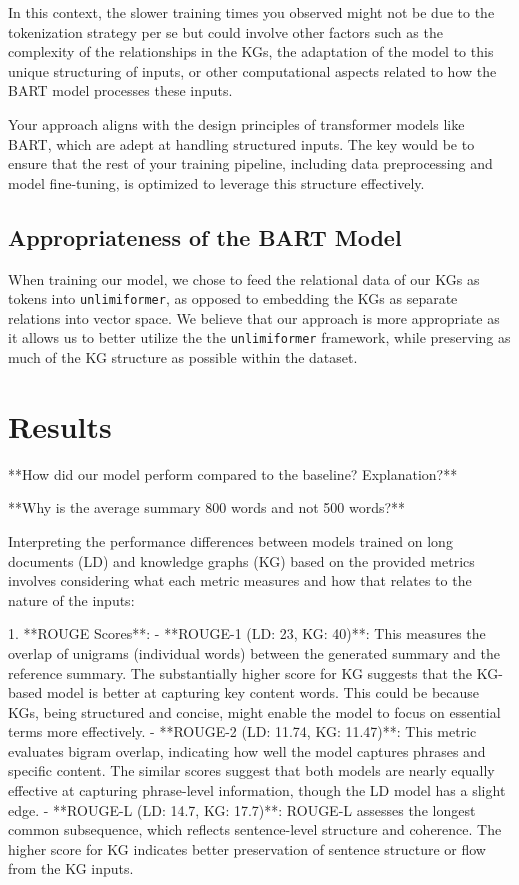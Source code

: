 \documentclass[12pt]{article}
\begin{document}
In this context, the slower training times you observed might not be due to the tokenization strategy per se but could involve other factors such as the complexity of the relationships in the KGs, the adaptation of the model to this unique structuring of inputs, or other computational aspects related to how the BART model processes these inputs.

Your approach aligns with the design principles of transformer models like BART, which are adept at handling structured inputs. The key would be to ensure that the rest of your training pipeline, including data preprocessing and model fine-tuning, is optimized to leverage this structure effectively.

\subsection*{Appropriateness of the BART Model}
When training our model, we chose to feed the relational data of our KGs as tokens into \texttt{unlimiformer}, as opposed to embedding the KGs as separate relations into vector space. We believe that our approach is more appropriate as it allows us to better utilize the the \texttt{unlimiformer} framework, while preserving as much of the KG structure as possible within the dataset.

\section{Results}
**How did our model perform compared to the baseline? Explanation?**

**Why is the average summary 800 words and not 500 words?**

Interpreting the performance differences between models trained on long documents (LD) and knowledge graphs (KG) based on the  provided metrics involves considering what each metric measures and how that relates to the nature of the inputs:

1. **ROUGE Scores**:
   - **ROUGE-1 (LD: 23, KG: 40)**: This measures the overlap of unigrams (individual words) between the generated summary and the reference summary. The substantially higher score for KG suggests that the KG-based model is better at capturing key content words. This could be because KGs, being structured and concise, might enable the model to focus on essential terms more effectively.
   - **ROUGE-2 (LD: 11.74, KG: 11.47)**: This metric evaluates bigram overlap, indicating how well the model captures phrases and specific content. The similar scores suggest that both models are nearly equally effective at capturing phrase-level information, though the LD model has a slight edge.
   - **ROUGE-L (LD: 14.7, KG: 17.7)**: ROUGE-L assesses the longest common subsequence, which reflects sentence-level structure and coherence. The higher score for KG indicates better preservation of sentence structure or flow from the KG inputs.
\end{document}
